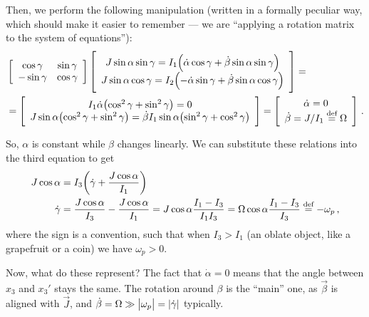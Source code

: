 \documentclass[main.tex]{subfiles}
\begin{document}
Then, we perform the following manipulation (written in a formally peculiar way, which should make it easier to remember --- we are ``applying a rotation matrix to the system of equations''): 
%
\begin{align}
&\left[\begin{array}{cc}
\cos \gamma  & \sin \gamma  \\ 
- \sin \gamma  & \cos \gamma 
\end{array}\right]
\left[\begin{array}{c}
J \sin \alpha \sin \gamma = I_1 \qty(\dot{\alpha} \cos \gamma + \dot{\beta} \sin \alpha \sin \gamma ) \\ 
J \sin \alpha \cos \gamma = I_2 \qty(- \dot{\alpha} \sin \gamma + \dot{\beta} \sin \alpha \cos \gamma)
\end{array}\right] = \\
&= \left[\begin{array}{c}
I_1 \dot{\alpha} \qty(\cos^2 \gamma + \sin^2 \gamma ) = 0 \\ 
J \sin \alpha \qty(\cos^2\gamma + \sin^2 \gamma ) = \dot{\beta} I_1 \sin \alpha \qty(\sin^2\gamma + \cos^2\gamma ) 
\end{array}\right] = 
\left[\begin{array}{c}
\dot{\alpha} = 0 \\ 
\dot{\beta} = J / I_1 \overset{\text{def}}{=} \Omega 
\end{array}\right]
\,.
\end{align}

So, \(\alpha \) is constant while \(\beta \) changes linearly. We can substitute these relations into the third equation to get 
%
\begin{align}
J \cos \alpha &= I_3 \qty(\dot{\gamma} + \frac{J \cos \alpha }{I_1 }) \\
\dot{\gamma} &= \frac{J \cos \alpha }{I_3 } - \frac{J \cos \alpha }{I_1 }
= J \cos \alpha \frac{I_1 - I_3 }{I_1 I_3 } = \Omega \cos \alpha \frac{I_1 - I_3 }{I_3 } \overset{\text{def}}{=} - \omega_{p}
\,,
\end{align}
%
where the sign is a convention, such that when \(I_3 > I_1 \) (an oblate object, like a grapefruit or a coin) we have \(\omega_{p} > 0\).

Now, what do these represent? The fact that \(\dot{\alpha} = 0\) means that the angle between \(x_3 \) and \(x_3'\) stays the same. 
The rotation around \(\beta \) is the ``main'' one, as \(\vec{\beta} \) is aligned with \(\vec{J}\), and \(\dot{\beta}= \Omega \gg \abs{\omega_{p}} = \abs{\dot{\gamma}}\) typically. 
\end{document}
